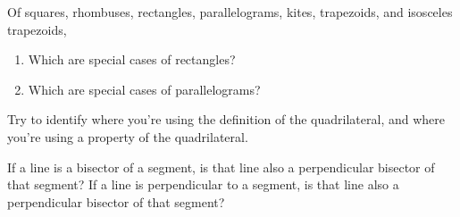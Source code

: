 \documentclass[nooutcomes]{ximera}
\begin{document}
\newpage
\begin{problem}  
Of squares, rhombuses, rectangles, parallelograms, kites, trapezoids, and isosceles trapezoids, 
\begin{enumerate}
    \item   Which are special cases of rectangles?
    \item Which are special cases of parallelograms? 
\end{enumerate}

Try to identify where you're using the definition of the quadrilateral, and where you're using a property of the quadrilateral.
\end{problem}




\begin{problem} If a line is a bisector of a segment, is that line also a perpendicular bisector of that segment?  If a line is perpendicular to a segment, is that line also a perpendicular bisector of that segment? 





\end{problem}
\end{document}
